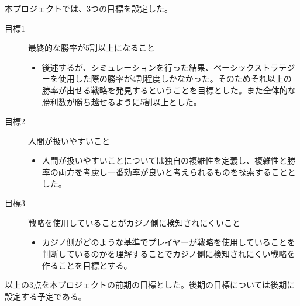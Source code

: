 本プロジェクトでは、3つの目標を設定した。
\begin{description}
\item[目標1] 最終的な勝率が5割以上になること
\begin{itemize}
\item{後述するが、シミュレーションを行った結果、ベーシックストラテジーを使用した際の勝率が4割程度しかなかった。そのためそれ以上の勝率が出せる戦略を発見するということを目標とした。また全体的な勝利数が勝ち越せるように5割以上とした。}
\end{itemize}
\item[目標2]人間が扱いやすいこと
\begin{itemize}
\item{人間が扱いやすいことについては独自の複雑性を定義し、複雑性と勝率の両方を考慮し一番効率が良いと考えられるものを探索することとした。}
\end{itemize}
\item[目標3]戦略を使用していることがカジノ側に検知されにくいこと
\begin{itemize}
\item{カジノ側がどのような基準でプレイヤーが戦略を使用していることを判断しているのかを理解することでカジノ側に検知されにくい戦略を作ることを目標とする。}
\end{itemize}
\end{description}
以上の3点を本プロジェクトの前期の目標とした。後期の目標については後期に設定する予定である。

